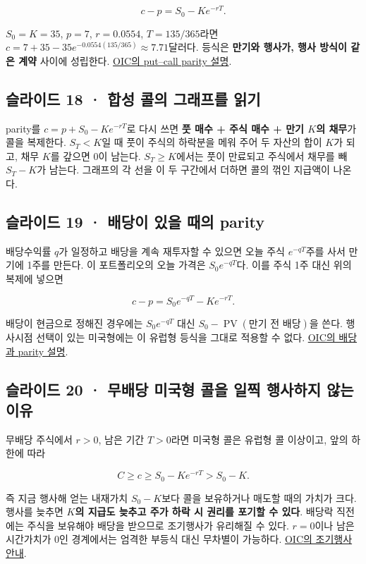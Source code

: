 \documentclass[11pt,a4paper]{article}
\begin{document}
\[
c-p=S_0-Ke^{-rT}.
\]

$S_0=K=35$, $p=7$, $r=0.0554$, $T=135/365$라면 $c=7+35-35e^{-0.0554(135/365)}\approx7.71$달러다. 등식은 \textbf{만기와 행사가, 행사 방식이 같은 계약} 사이에 성립한다. \href{https://www.optionseducation.org/advancedconcepts/put-call-parity}{OIC의 put–call parity 설명}.\par

\subsection{슬라이드 18 · 합성 콜의 그래프를 읽기}
parity를 $c=p+S_0-Ke^{-rT}$로 다시 쓰면 \textbf{풋 매수 + 주식 매수 + 만기 $K$의 채무}가 콜을 복제한다. $S_T<K$일 때 풋이 주식의 하락분을 메워 주어 두 자산의 합이 $K$가 되고, 채무 $K$를 갚으면 0이 남는다. $S_T\geq K$에서는 풋이 만료되고 주식에서 채무를 빼 $S_T-K$가 남는다. 그래프의 각 선을 이 두 구간에서 더하면 콜의 꺾인 지급액이 나온다.\par

\subsection{슬라이드 19 · 배당이 있을 때의 parity}
배당수익률 $q$가 일정하고 배당을 계속 재투자할 수 있으면 오늘 주식 $e^{-qT}$주를 사서 만기에 1주를 만든다. 이 포트폴리오의 오늘 가격은 $S_0e^{-qT}$다. 이를 주식 1주 대신 위의 복제에 넣으면\par

\[
c-p=S_0e^{-qT}-Ke^{-rT}.
\]

배당이 현금으로 정해진 경우에는 $S_0e^{-qT}$ 대신 \textbf{$S_0-\operatorname{PV}(\text{만기 전 배당})$}을 쓴다. 행사시점 선택이 있는 미국형에는 이 유럽형 등식을 그대로 적용할 수 없다. \href{https://www.optionseducation.org/advancedconcepts/put-call-parity}{OIC의 배당과 parity 설명}.\par

\subsection{슬라이드 20 · 무배당 미국형 콜을 일찍 행사하지 않는 이유}
무배당 주식에서 $r>0$, 남은 기간 $T>0$라면 미국형 콜은 유럽형 콜 이상이고, 앞의 하한에 따라\par

\[
C\geq c\geq S_0-Ke^{-rT}>S_0-K.
\]

즉 지금 행사해 얻는 내재가치 $S_0-K$보다 콜을 보유하거나 매도할 때의 가치가 크다. 행사를 늦추면 \textbf{$K$의 지급도 늦추고 주가 하락 시 권리를 포기할 수 있다}. 배당락 직전에는 주식을 보유해야 배당을 받으므로 조기행사가 유리해질 수 있다. $r=0$이나 남은 시간가치가 0인 경계에서는 엄격한 부등식 대신 무차별이 가능하다. \href{https://www.optionseducation.org/optionsoverview/exercising-options}{OIC의 조기행사 안내}.\par
\end{document}
